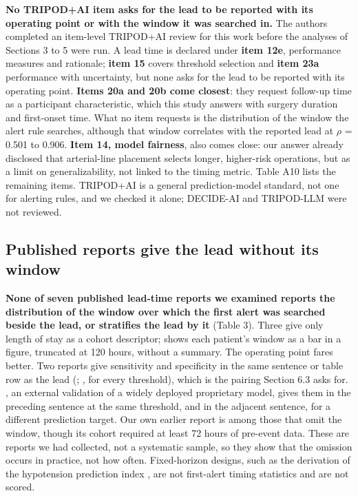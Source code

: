 \textbf{No TRIPOD+AI item asks for the lead to be reported with its operating point or with the window
it was searched in.} The authors completed an item-level TRIPOD+AI review for this work before
the analyses of Sections 3 to 5 were run. A lead time is declared under \textbf{item 12e}, performance measures and
rationale; \textbf{item 15} covers threshold selection and \textbf{item 23a} performance with uncertainty,
but none asks for the lead to be reported with its operating point. \textbf{Items 20a and 20b come
closest}: they request follow-up time as a participant characteristic, which this study answers
with surgery duration and first-onset time. What no item requests is the distribution of the
window the alert rule searches, although that window correlates with the reported lead at
$\rho$ = 0.501 to 0.906. \textbf{Item 14, model fairness}, also comes close: our answer already
disclosed that arterial-line placement selects longer, higher-risk operations, but as a limit on
generalizability, not linked to the timing metric. Table A10 lists the remaining
items. TRIPOD+AI is a general prediction-model standard, not one for alerting rules, and we
checked it alone; DECIDE-AI and TRIPOD-LLM were not reviewed.

\subsection{Published reports give the lead without its window}\label{published-reports-give-the-lead-without-its-window}

\textbf{None of seven published lead-time reports we examined reports the distribution of the window
over which the first alert was searched beside the lead, or stratifies the lead by it} (Table 3).
Three give only length of stay as a cohort descriptor; \citet{henry2015trewscore} shows each patient's window as a bar in a figure,
truncated at 120 hours, without a summary. The operating point fares better. Two reports
give sensitivity and specificity in the same sentence or table row as the lead
(\citet{henry2015trewscore}; \citet{churpek2020aki}, for every threshold), which is the pairing Section 6.3 asks
for. \citet{wong2021sepsis}, an external validation of a widely deployed proprietary model, gives them in
the preceding sentence at the same threshold, and \citet{koyner2018aki} in the adjacent sentence, for a
different prediction target. Our own earlier report is among those that omit the window,
though its cohort required at least 72 hours of pre-event data. These are reports we had
collected, not a systematic sample, so they show that the omission occurs in practice, not how
often. Fixed-horizon designs, such as the derivation of the hypotension prediction index
\citep{hatib2018hpi, davies2020hpi}, are not first-alert timing statistics and are not scored.

